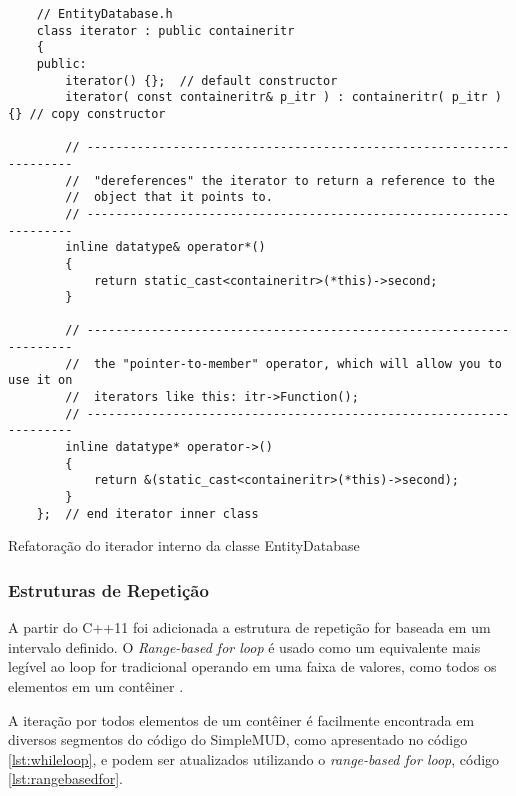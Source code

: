 \begin{listing}[!ht]
    \begin{verbatim}
    // EntityDatabase.h
    class iterator : public containeritr
    {
    public:
        iterator() {};  // default constructor
        iterator( const containeritr& p_itr ) : containeritr( p_itr ){} // copy constructor

        // --------------------------------------------------------------------
        //  "dereferences" the iterator to return a reference to the
        //  object that it points to.
        // --------------------------------------------------------------------
        inline datatype& operator*() 
        {
            return static_cast<containeritr>(*this)->second;
        }

        // --------------------------------------------------------------------
        //  the "pointer-to-member" operator, which will allow you to use it on
        //  iterators like this: itr->Function();
        // --------------------------------------------------------------------
        inline datatype* operator->()
        {
            return &(static_cast<containeritr>(*this)->second);
        }
    };  // end iterator inner class
    \end{verbatim}
\caption{Refatoração do iterador interno da classe EntityDatabase}
\label{lst:innerIteratorEntityDatabaseRefc}
\end{listing}

\subsubsection{Estruturas de Repetição}

A partir do C++11 foi adicionada a estrutura de repetição for baseada em um intervalo definido. 
O \textit{Range-based for loop} é usado como um equivalente mais legível ao loop for tradicional 
operando em uma faixa de valores, como todos os elementos em um contêiner \cite{rangebasedfor}. 

A iteração por todos elementos de um contêiner é facilmente encontrada em diversos segmentos do 
código do SimpleMUD, como apresentado no código \ref{lst:whileloop}, e podem ser atualizados utilizando
o \textit{range-based for loop}, código \ref{lst:rangebasedfor}.

